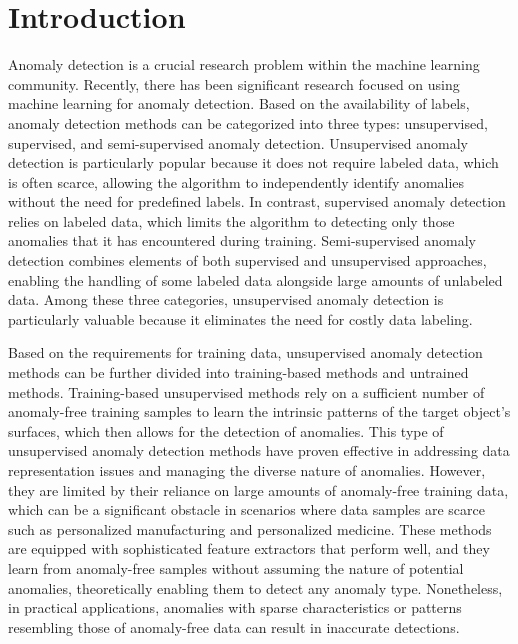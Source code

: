 \section{Introduction}
\label{Introduction}

Anomaly detection is a crucial research problem within the machine learning community. Recently, there has been significant research focused on using machine learning for anomaly detection. Based on the availability of labels, anomaly detection methods can be categorized into three types: unsupervised, supervised, and semi-supervised anomaly detection. Unsupervised anomaly detection is particularly popular because it does not require labeled data, which is often scarce, allowing the algorithm to independently identify anomalies without the need for predefined labels. In contrast, supervised anomaly detection relies on labeled data, which limits the algorithm to detecting only those anomalies that it has encountered during training. Semi-supervised anomaly detection combines elements of both supervised and unsupervised approaches, enabling the handling of some labeled data alongside large amounts of unlabeled data. Among these three categories, unsupervised anomaly detection is particularly valuable because it eliminates the need for costly data labeling.

Based on the requirements for training data, unsupervised anomaly detection methods can be further divided into training-based methods and untrained methods. Training-based unsupervised methods rely on a sufficient number of anomaly-free training samples to learn the intrinsic patterns of the target object's surfaces, which then allows for the detection of anomalies. This type of unsupervised anomaly detection methods have proven effective in addressing data representation issues and managing the diverse nature of anomalies. However, they are limited by their reliance on large amounts of anomaly-free training data, which can be a significant obstacle in scenarios where data samples are scarce such as personalized manufacturing and personalized medicine. These methods are equipped with sophisticated feature extractors that perform well, and they learn from anomaly-free samples without assuming the nature of potential anomalies, theoretically enabling them to detect any anomaly type. Nonetheless, in practical applications, anomalies with sparse characteristics or patterns resembling those of anomaly-free data can result in inaccurate detections.

